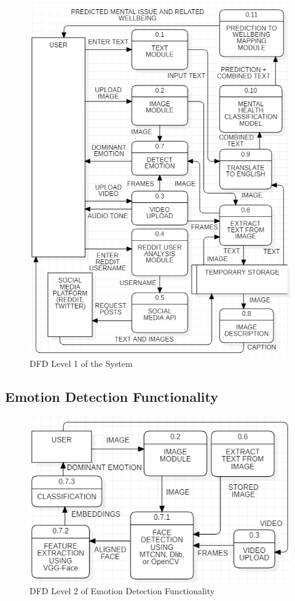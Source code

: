 \begin{figure}[h!]  
    \centering
    \includegraphics[width=1.0\textwidth]{Images/DFD L1.png}  
    \caption{DFD Level 1 of the System}
    \label{dfdl1234}  %
\end{figure}


\subsection{Emotion Detection Functionality}

\begin{figure}[h!]  
    \centering
    \includegraphics[width=1.0\textwidth]{Images/DFD L2 EMOTION.png}  
    \caption{DFD Level 2 of Emotion Detection Functionality}
    \label{dfdl14456}  %
\end{figure}

